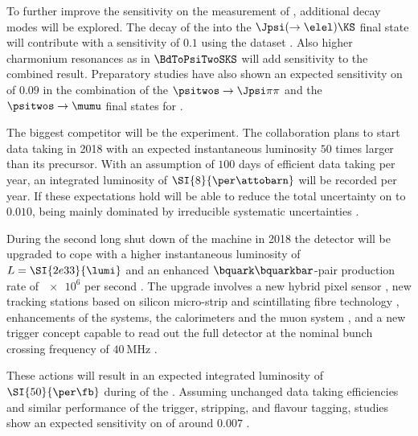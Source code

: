 To further improve the sensitivity on the measurement of \sintwobeta, additional
decay modes will be explored. The decay of the \Bd into the $\Jpsi (\to\elel)
\KS$ final state will contribute with a sensitivity of $\num{0.1}$ using the
\RunOne dataset \cite{bdtojpsieeks:ramon}. Also higher charmonium resonances
as in $\BdToPsiTwoSKS$ will add sensitivity to the combined result. Preparatory
studies have also shown an expected sensitivity on \sintwobeta of
$\num{0.09}$ in the combination of the $\psitwos\to\Jpsi\pi\pi$ and the
$\psitwos\to\mumu$ final states \cite{Mueller:2014} for \RunOne.

The biggest competitor will be the \BelleTwo experiment. The collaboration plans
to start data taking in 2018 with an expected instantaneous luminosity
$\num{50}$ times larger than its precursor. With an assumption of $\num{100}$
days of efficient data taking per year, an integrated luminosity of
$\SI{8}{\per\attobarn}$ will be recorded per year. If these expectations hold
\BelleTwo will be able to reduce the total uncertainty on \sintwobeta to
$\num{0.010}$, being mainly dominated by irreducible systematic uncertainties
\cite{Aushev:2010bq}.

During the second long shut down of the \LHC machine in 2018 the \LHCb detector
will be upgraded to cope with a higher instantaneous luminosity of $L =
\SI{2e33}{\lumi}$ and an enhanced $\bquark\bquarkbar$-pair production rate of
$\num{e6}$ per second \cite{Bediaga:1443882}. The upgrade involves a new hybrid
pixel sensor \VELO \cite{TDRVELO}, new tracking stations based on silicon
micro-strip and scintillating fibre technology \cite{TDRTracking}, enhancements
of the \RICH systems, the calorimeters and the muon system \cite{TDRPID}, and a
new trigger concept capable to read out the full detector at the nominal bunch
crossing frequency of $\SI{40}{\mega\hertz}$ \cite{TDRTrigger}.

These actions will result in an expected integrated luminosity of
$\SI{50}{\per\fb}$ during \RunThree of the \LHC. Assuming unchanged data taking
efficiencies and similar performance of the trigger, stripping, and flavour
tagging, \ToyMC studies show an expected sensitivity on \sintwobeta of around
$\num{0.007}$ \cite{Moedden:2015}.
